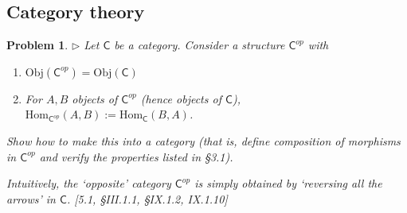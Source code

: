 \documentclass[fontsize=14pt]{scrartcl}
\newtheorem{problem-internal}{Problem}[subsection]
\newenvironment{problem}{
  \medskip
  \begin{problem-internal}
}{
  \end{problem-internal}
}
\newcommand{\Obj}{\mathrm{Obj}}
\newcommand{\Hom}{\mathrm{Hom}}
\begin{document}
\subsection{Category theory}


\begin{problem}
$\rhd$ Let $\mathsf{C}$ be a category. Consider a structure
$\mathsf{C}^{op}$ with
\begin{enumerate}
\item $\Obj(\mathsf{C}^{op}) = \Obj(\mathsf{C})$
\item For $A, B$ objects of $\mathsf{C}^{op}$ (hence objects of $\mathsf{C}$),
$\Hom_{\mathsf{C}^{op}}(A, B) := \Hom_{\mathsf{C}}(B, A)$.
\end{enumerate}
Show how to make this into a category (that is, define composition of morphisms
in $\mathsf{C}^{op}$ and verify the properties listed in \S3.1).

Intuitively, the `opposite' category $\mathsf{C}^{op}$ is simply obtained by
`reversing all the arrows' in $\mathsf{C}$. [5.1, \S III.1.1, \S IX.1.2,
IX.1.10]
\end{problem}
\end{document}
